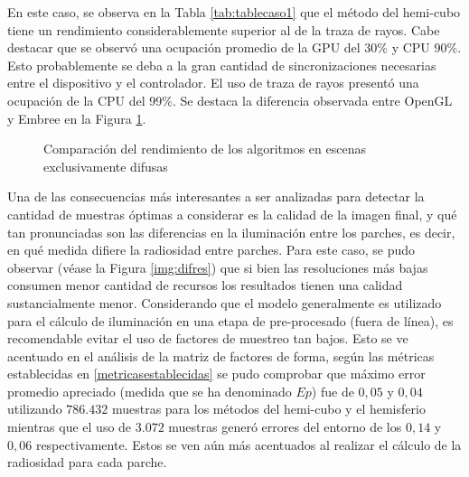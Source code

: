 En este caso, se observa en la Tabla \ref{tab:tablecaso1} que el método del hemi-cubo tiene un rendimiento considerablemente superior al de la traza de rayos. Cabe destacar que se observó una ocupación promedio de la GPU del 30\% y CPU 90\%. Esto probablemente se deba a la gran cantidad de sincronizaciones necesarias entre el dispositivo y el controlador. El uso de traza de rayos presentó una ocupación de la CPU del 99\%. Se destaca la diferencia observada entre OpenGL y Embree en la Figura \ref{plot:emglc1}.

\begin{figure}
\caption{Comparación del rendimiento de los algoritmos en escenas exclusivamente difusas}
\label{plot:emglc1}
\end{figure}

Una de las consecuencias más interesantes a ser analizadas para detectar la cantidad de muestras óptimas a considerar es la calidad de la imagen final, y qué tan pronunciadas son las diferencias en la iluminación entre los parches, es decir, en qué medida difiere la radiosidad entre parches. Para este caso, se pudo observar (véase la Figura \ref{img:difres}) que si bien las resoluciones más bajas consumen menor cantidad de recursos los resultados tienen una calidad sustancialmente menor. Considerando que el modelo generalmente es utilizado para el cálculo de iluminación en una etapa de pre-procesado (fuera de línea), es recomendable evitar el uso de factores de muestreo tan bajos. Esto se ve acentuado en el análisis de la matriz de factores de forma, según las métricas establecidas en \ref{metricasestablecidas} se pudo comprobar que máximo error promedio apreciado (medida que se ha denominado $Ep$) fue de $0,05$ y $0,04$ utilizando $786.432$ muestras para los métodos del hemi-cubo y el hemisferio mientras que el uso de $3.072$ muestras generó errores del entorno de los $0,14$ y $0,06$ respectivamente. Estos se ven aún más acentuados al realizar el cálculo de la radiosidad para cada parche.

